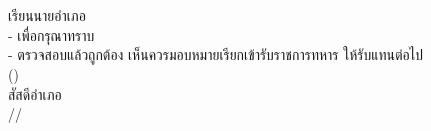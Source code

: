\documentclass[a4paper,13pt]{article}
\begin{document}
\indent\hspace{2.6in} \\
\indent\hspace{2.9in} \\

\noindent
เรียน\hspace{10pt}นายอำเภอ \\
\indent\hspace{5pt}- เพื่อกรุณาทราบ \\
\indent\hspace{5pt}- ตรวจสอบแล้วถูกต้อง เห็นควรมอบหมายเรียกเข้ารับราชการทหาร ให้รับแทนต่อไป \\

\indent\hspace{2.9in}(\makebox[2in]{\Dotfill}) \\
\indent\hspace{3.7in}สัสดีอำเภอ \\
\indent\hspace{3.2in}\makebox[0.5in]{\Dotfill}/\makebox[0.5in]{\Dotfill}/\makebox[0.5in]{\Dotfill}
\end{document}
